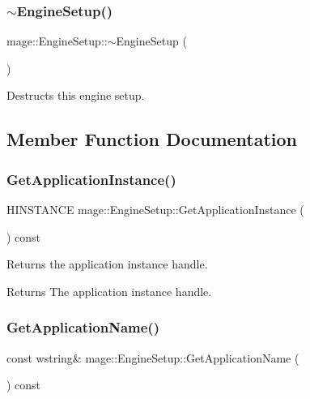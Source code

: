 \subsubsection{\texorpdfstring{$\sim$\+Engine\+Setup()}{~EngineSetup()}}
{\footnotesize\ttfamily mage\+::\+Engine\+Setup\+::$\sim$\+Engine\+Setup (\begin{DoxyParamCaption}{ }\end{DoxyParamCaption})\hspace{0.3cm}{\ttfamily [default]}}

Destructs this engine setup. 

\subsection{Member Function Documentation}
\hypertarget{classmage_1_1_engine_setup_ac29f9c2b68f8afada8009190616bf36b}{}\label{classmage_1_1_engine_setup_ac29f9c2b68f8afada8009190616bf36b} 
\subsubsection{\texorpdfstring{Get\+Application\+Instance()}{GetApplicationInstance()}}
{\footnotesize\ttfamily H\+I\+N\+S\+T\+A\+N\+CE mage\+::\+Engine\+Setup\+::\+Get\+Application\+Instance (\begin{DoxyParamCaption}{ }\end{DoxyParamCaption}) const\hspace{0.3cm}{\ttfamily [noexcept]}}

Returns the application instance handle.

\begin{DoxyReturn}{Returns}
The application instance handle. 
\end{DoxyReturn}
\hypertarget{classmage_1_1_engine_setup_ab79015dba68069256ed42595b30a5728}{}\label{classmage_1_1_engine_setup_ab79015dba68069256ed42595b30a5728} 
\subsubsection{\texorpdfstring{Get\+Application\+Name()}{GetApplicationName()}}
{\footnotesize\ttfamily const wstring\& mage\+::\+Engine\+Setup\+::\+Get\+Application\+Name (\begin{DoxyParamCaption}{ }\end{DoxyParamCaption}) const\hspace{0.3cm}{\ttfamily [noexcept]}}

